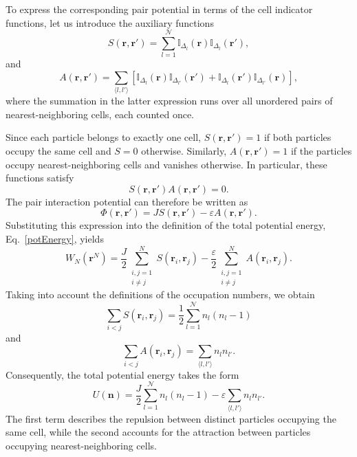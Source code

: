 \documentclass[12pt]{article}
\begin{document}
	To express the corresponding pair potential in terms of the cell indicator functions, let us introduce the auxiliary functions
	\begin{equation}
		S(\mathbf{r}, \mathbf{r}') = \sum_{l=1}^{\mathcal{N}} \mathbb{I}_{\Delta_l}(\mathbf{r}) \mathbb{I}_{\Delta_l}(\mathbf{r}'),
	\end{equation}
	and
	\begin{equation}
		A(\mathbf{r}, \mathbf{r}') = \sum_{\langle l, l' \rangle}
		\left[ \mathbb{I}_{\Delta_l}(\mathbf{r}) \mathbb{I}_{\Delta_{l'}}(\mathbf{r}') + \mathbb{I}_{\Delta_l}(\mathbf{r}') \mathbb{I}_{\Delta_{l'}}(\mathbf{r}) \right],
	\end{equation}
	where the summation in the latter expression runs over all unordered pairs of nearest-neighboring cells, each counted once.
	
	Since each particle belongs to exactly one cell, $S(\mathbf{r}, \mathbf{r}') = 1$ if both particles occupy the same cell and $S=0$ otherwise. Similarly, $A(\mathbf{r}, \mathbf{r}') = 1$ if the particles occupy nearest-neighboring cells and vanishes otherwise. In particular, these functions satisfy
	\begin{equation}
		S(\mathbf{r}, \mathbf{r}') A(\mathbf{r}, \mathbf{r}') = 0.
	\end{equation}
	The pair interaction potential can therefore be written as
	\begin{equation}
		\Phi(\mathbf{r}, \mathbf{r}') = J S(\mathbf{r}, \mathbf{r}') - \varepsilon A(\mathbf{r}, \mathbf{r}').
	\end{equation}
	Substituting this expression into the definition of the total potential energy, Eq.~\eqref{potEnergy}, yields
	\begin{equation}
		W_N(\mathbf{r}^N) = \frac{J}{2} \sum_{\substack{i, j = 1 \\ i \ne j}}^{N} S(\mathbf{r}_i, \mathbf{r}_j) - \frac{\varepsilon}{2} \sum_{\substack{i, j = 1 \\ i \neq j}}^{N} A(\mathbf{r}_i, \mathbf{r}_j).
	\end{equation}
	Taking into account the definitions of the occupation numbers, we obtain
	\begin{equation}
		\sum_{i < j} S(\mathbf{r}_i, \mathbf{r}_j) = \frac{1}{2} \sum_{l=1}^{\mathcal{N}} n_l (n_l - 1)
	\end{equation}
	and 
	\begin{equation}
		\sum_{i < j} A(\mathbf{r}_i, \mathbf{r}_j) = \sum_{\langle l, l' \rangle} n_l n_{l'}.
	\end{equation}
	Consequently, the total potential energy takes the form
	\begin{equation}
		U(\mathbf{n}) = \frac{J}{2} \sum_{l=1}^{\mathcal{N}} n_l (n_l - 1) - \varepsilon \sum_{\langle l, l' \rangle} n_l n_{l'}.
	\end{equation}
	The first term describes the repulsion between distinct particles occupying the same cell, while the second accounts for the attraction between particles occupying nearest-neighboring cells.
	
\end{document}
